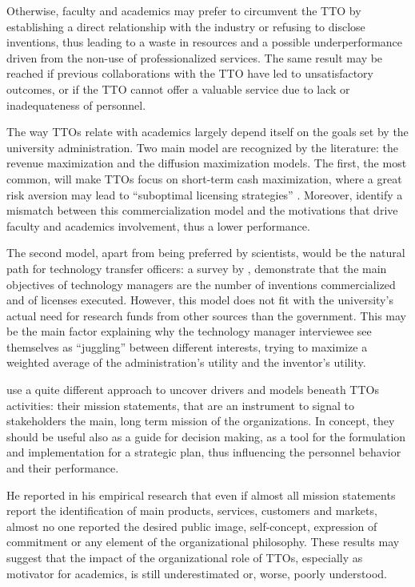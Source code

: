 Otherwise, faculty and academics may prefer to circumvent the TTO by establishing a direct relationship with the industry or refusing to disclose inventions, thus leading to a waste in resources and a possible underperformance driven from the non-use of professionalized services. The same result may be reached if previous collaborations with the TTO have led to unsatisfactory outcomes, or if the TTO cannot offer a valuable service due to lack or inadequateness of personnel. 

The way TTOs relate with academics largely depend itself on the goals set by the university administration. Two main model are recognized by the literature: the revenue maximization and the diffusion maximization models. The first, the most common, will make TTOs focus on short-term cash maximization, where a great risk aversion may lead to \enquote{suboptimal licensing strategies} \citep{Markman2005}. Moreover, \citet{Siegel2003} identify a mismatch between this commercialization model and the motivations that drive faculty and academics involvement, thus a lower performance.

The second model, apart from being preferred by scientists, would be the natural path for technology transfer officers: a survey by \citet{Jensen1998}, demonstrate that the main objectives of technology managers are the number of inventions commercialized and of licenses executed. However, this model does not fit with the university's actual need for research funds from other sources than the government. This may be the main factor explaining why the technology manager interviewee see themselves as \enquote{juggling} between different interests, trying to maximize a weighted average of the administration's utility and the inventor's utility.

\citet{Fitzgerald2015} use a quite different approach to uncover drivers and models beneath TTOs activities: their mission statements, that are an instrument to signal to stakeholders the main, long term mission of the organizations. In concept, they should be useful also as a guide for decision making, as a tool for the formulation and implementation for a strategic plan, thus influencing the personnel behavior and their performance.

He reported in his empirical research that even if almost all mission statements report the identification of main products, services, customers and markets, almost no one reported the desired public image, self-concept, expression of commitment or any element of the organizational philosophy. These results may suggest that the impact of the organizational role of TTOs, especially as motivator for academics, is still underestimated or, worse, poorly understood. 

